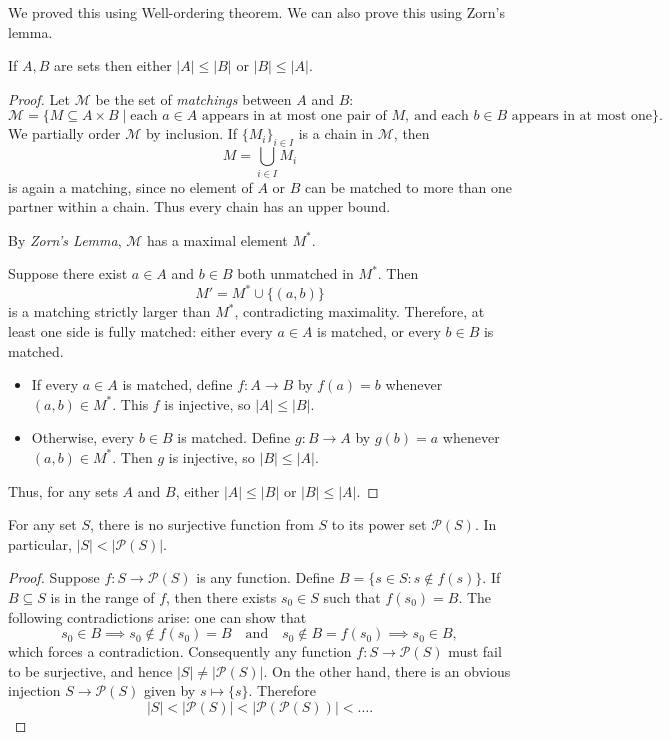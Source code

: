 We proved this using Well-ordering theorem. We can also prove this using Zorn's lemma.
\begin{theorem}
If $A,B$ are sets then either $|A|\le |B|$ or $|B|\le |A|$.
\end{theorem}

\begin{proof}
Let $\mathcal{M}$ be the set of \emph{matchings} between $A$ and $B$:
\[
\mathcal{M} = \{ M \subseteq A \times B \mid \text{each } a \in A \text{ appears in at most one pair of } M, \ \text{and each } b \in B \text{ appears in at most one} \}.
\]
We partially order $\mathcal{M}$ by inclusion.  
If $\{ M_i \}_{i \in I}$ is a chain in $\mathcal{M}$, then
\[
M = \bigcup_{i \in I} M_i
\]
is again a matching, since no element of $A$ or $B$ can be matched to more than one partner within a chain. Thus every chain has an upper bound.

By \emph{Zorn's Lemma}, $\mathcal{M}$ has a maximal element $M^\ast$.

Suppose there exist $a \in A$ and $b \in B$ both unmatched in $M^\ast$. Then
\[
M' = M^\ast \cup \{ (a,b) \}
\]
is a matching strictly larger than $M^\ast$, contradicting maximality. Therefore, at least one side is fully matched: either every $a \in A$ is matched, or every $b \in B$ is matched.

\begin{itemize}
    \item If every $a \in A$ is matched, define $f: A \to B$ by $f(a) = b$ whenever $(a,b) \in M^\ast$. This $f$ is injective, so $|A| \le |B|$.
    \item Otherwise, every $b \in B$ is matched. Define $g: B \to A$ by $g(b) = a$ whenever $(a,b) \in M^\ast$. Then $g$ is injective, so $|B| \le |A|$.
\end{itemize}

Thus, for any sets $A$ and $B$, either $|A| \le |B|$ or $|B| \le |A|$.
\end{proof}

\begin{theorem}
For any set $S$, there is no surjective function from $S$ to its power set $\mathcal{P}(S)$. In particular, $|S| < |\mathcal{P}(S)|$.
\end{theorem}

\begin{proof}
Suppose $f\colon S\to \mathcal{P}(S)$ is any function. Define $B = \{s \in S : s \notin f(s)\}$. If $B\subseteq S$ is in the range of $f$, then there exists $s_0 \in S$ such that $f(s_0) = B$. The following contradictions arise: one can show that
\[s_0\in B \implies s_0\notin f(s_0) = B \quad\text{and}\quad s_0\notin B = f(s_0) \implies s_0\in B,\]
which forces a contradiction. Consequently any function $f\colon S\to \mathcal{P}(S)$ must fail to be surjective, and hence $|S|\neq |\mathcal{P}(S)|$. On the other hand, there is an obvious injection $S\to \mathcal{P}(S)$ given by $s\mapsto\{s\}$. Therefore
\[|S| < |\mathcal{P}(S)|<|\mathcal{P}(\mathcal{P}(S))|<\dots.
\]
\end{proof}


\newpage
